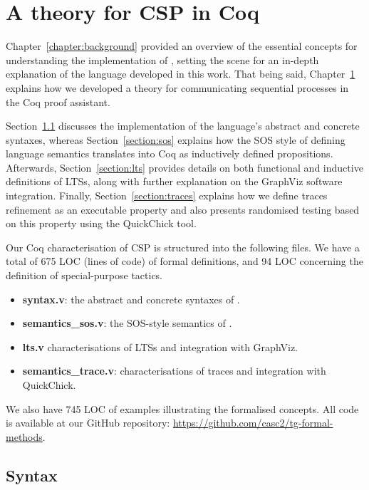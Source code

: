 \chapter{A theory for CSP in Coq}
\label{chapter:csp_coq}

Chapter~\ref{chapter:background} provided an overview of the essential concepts for understanding the implementation of \CSPcoq{}, setting the scene for an in-depth explanation of the language developed in this work. That being said, Chapter~\ref{chapter:csp_coq} explains how we developed a theory for communicating sequential processes in the Coq proof assistant.

Section~\ref{section:syntax} discusses the implementation of the language's abstract and concrete syntaxes, whereas Section~\ref{section:sos} explains how the SOS style of defining language semantics translates into Coq as inductively defined propositions. Afterwards, Section~\ref{section:lts} provides details on both functional and inductive definitions of LTSs, along with further explanation on the GraphViz software integration. Finally, Section~\ref{section:traces} explains how we define traces refinement as an executable property and also presents randomised testing based on this property using the QuickChick tool.

Our Coq characterisation of CSP is structured into the following files. We have a total of 675 LOC (lines of code) of formal definitions, and 94 LOC concerning the definition of special-purpose tactics.

\begin{itemize}
	\item \textbf{syntax.v}: the abstract and concrete syntaxes of \CSPcoq{}.
	\item \textbf{semantics\_sos.v}: the SOS-style semantics of \CSPcoq{}.
	\item \textbf{lts.v} characterisations of LTSs and integration with GraphViz.
	\item \textbf{semantics\_trace.v}: characterisations of traces and integration with QuickChick.
\end{itemize}

We also have 745 LOC of examples illustrating the formalised concepts. All code is available at our GitHub repository: \url{https://github.com/casc2/tg-formal-methods}.

\section{Syntax}
\label{section:syntax}

